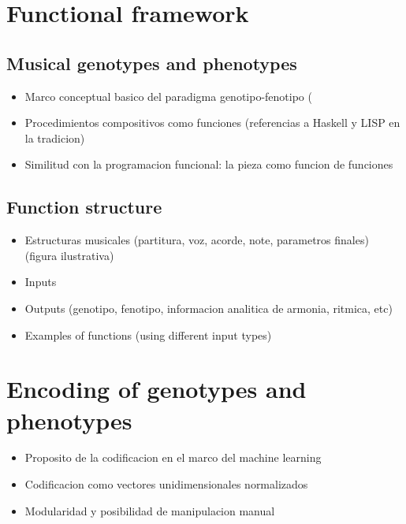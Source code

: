 \documentclass{article}
\begin{document}


\section{Functional framework}

\subsection{Musical genotypes and phenotypes}
\begin{itemize}
\item Marco conceptual basico del paradigma genotipo-fenotipo (
\item Procedimientos compositivos como funciones (referencias a Haskell y LISP en la tradicion)
\item Similitud con la programacion funcional: la pieza como funcion de funciones
\end{itemize}

\subsection{Function structure}
\begin{itemize}
\item Estructuras musicales (partitura, voz, acorde, note, parametros finales) (figura ilustrativa)
\item Inputs
\item Outputs (genotipo, fenotipo, informacion analitica de armonia, ritmica, etc)
\item Examples of functions (using different input types)

\end{itemize}




\section{Encoding of genotypes and phenotypes}
\begin{itemize}
\item Proposito de la codificacion en el marco del machine learning
\item Codificacion como vectores unidimensionales normalizados
\item Modularidad y posibilidad de manipulacion manual
\end{itemize}
\end{document}
